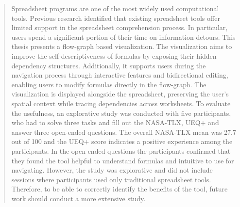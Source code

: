 \begin{abstract}
    Spreadsheet programs are one of the most widely used computational tools. Previous research identified that existing spreadsheet tools offer limited support in the spreadsheet comprehension process. In particular, users spend a significant portion of their time on information detours. This thesis presents a flow-graph based visualization. The visualization aims to improve the self-descriptiveness of formulas by exposing their hidden dependency structures. Additionally, it supports users during the navigation process through interactive features and bidirectional editing, enabling users to modify formulas directly in the flow-graph. The visualization is displayed alongside the spreadsheet, preserving the user's spatial context while tracing dependencies across worksheets. To evaluate the usefulness, an explorative study was conducted with five participants, who had to solve three tasks and fill out the NASA-TLX, UEQ+ and answer three open-ended questions. The overall NASA-TLX mean was 27.7 out of 100 and the UEQ+ score indicates a positive experience among the participants. In the open-ended questions the participants confirmed that they found the tool helpful to understand formulas and intuitive to use for navigating. However, the study was explorative and did not include sessions where participants used only traditional spreadsheet tools. Therefore, to be able to correctly identify the benefits of the tool, future work should conduct a more extensive study.
\end{abstract}